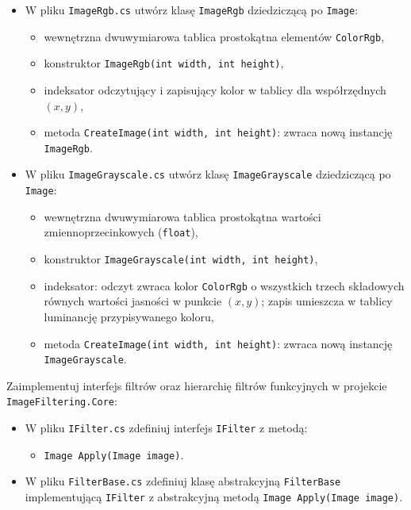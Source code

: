 \documentclass[11pt,a4paper,addpoints]{exam}
\begin{document}
\begin{questions}
\begin{itemize}
    \item W pliku \texttt{ImageRgb.cs} utwórz klasę \texttt{ImageRgb} dziedziczącą po \texttt{Image}:
    \begin{itemize}
        \item wewnętrzna dwuwymiarowa tablica prostokątna elementów \texttt{ColorRgb},
        \item konstruktor \texttt{ImageRgb(int width, int height)},
        \item indeksator odczytujący i zapisujący kolor w tablicy dla współrzędnych $(x, y)$,
        \item metoda \texttt{CreateImage(int width, int height)}: zwraca nową instancję \texttt{ImageRgb}.
    \end{itemize}

    \item W pliku \texttt{ImageGrayscale.cs} utwórz klasę \texttt{ImageGrayscale} dziedziczącą po \texttt{Image}:
    \begin{itemize}
        \item wewnętrzna dwuwymiarowa tablica prostokątna wartości zmiennoprzecinkowych (\texttt{float}),
        \item konstruktor \texttt{ImageGrayscale(int width, int height)},
        \item indeksator: odczyt zwraca kolor \texttt{ColorRgb} o wszystkich trzech składowych równych wartości jasności w punkcie $(x, y)$; zapis umieszcza w tablicy luminancję przypisywanego koloru,
        \item metoda \texttt{CreateImage(int width, int height)}: zwraca nową instancję \texttt{ImageGrayscale}.
    \end{itemize}
\end{itemize}

\question[4]
Zaimplementuj interfejs filtrów oraz hierarchię filtrów funkcyjnych w projekcie \texttt{ImageFiltering.Core}:
\begin{itemize}
    \item W pliku \texttt{IFilter.cs} zdefiniuj interfejs \texttt{IFilter} z metodą:
    \begin{itemize}
        \item \texttt{Image Apply(Image image)}.
    \end{itemize}

    \item W pliku \texttt{FilterBase.cs} zdefiniuj klasę abstrakcyjną \texttt{FilterBase} implementującą \texttt{IFilter} z abstrakcyjną metodą \texttt{Image Apply(Image image)}.


\end{itemize}
\end{questions}
\end{document}
